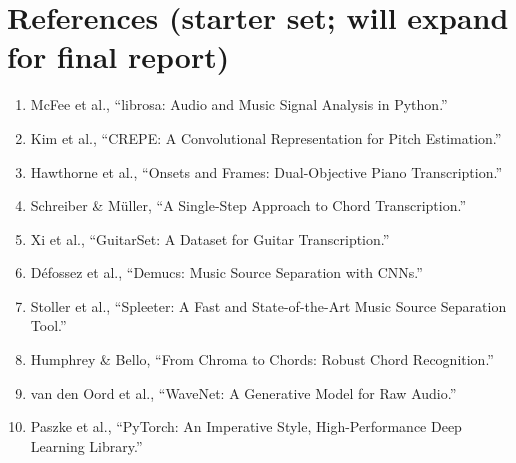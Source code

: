 \documentclass[11pt]{article}
\begin{document}
\section*{References (starter set; will expand for final report)}
\begin{enumerate}[leftmargin=*,itemsep=2pt]
  \item McFee et al., ``librosa: Audio and Music Signal Analysis in Python.''
  \item Kim et al., ``CREPE: A Convolutional Representation for Pitch Estimation.''
  \item Hawthorne et al., ``Onsets and Frames: Dual-Objective Piano Transcription.''
  \item Schreiber \& Müller, ``A Single-Step Approach to Chord Transcription.''
  \item Xi et al., ``GuitarSet: A Dataset for Guitar Transcription.''
  \item Défossez et al., ``Demucs: Music Source Separation with CNNs.''
  \item Stoller et al., ``Spleeter: A Fast and State-of-the-Art Music Source Separation Tool.''
  \item Humphrey \& Bello, ``From Chroma to Chords: Robust Chord Recognition.''
  \item van den Oord et al., ``WaveNet: A Generative Model for Raw Audio.''
  \item Paszke et al., ``PyTorch: An Imperative Style, High-Performance Deep Learning Library.''
\end{enumerate}
\end{document}
